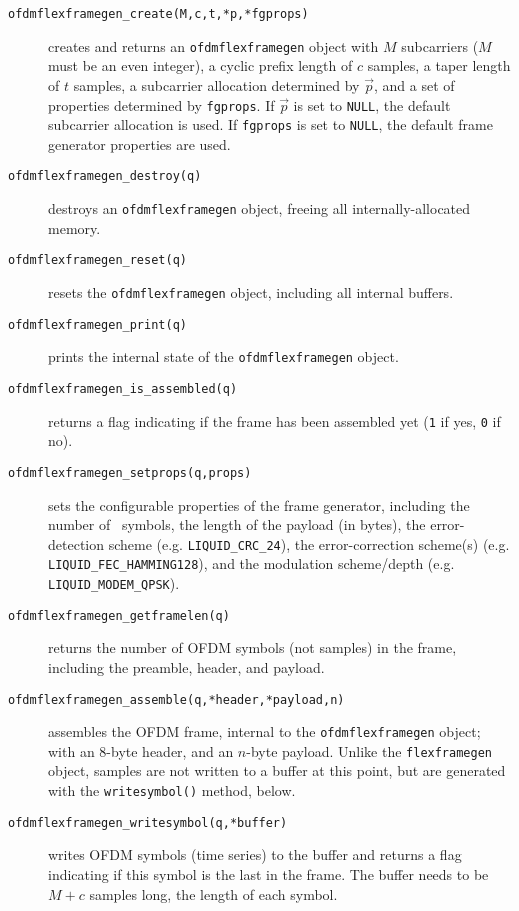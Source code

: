 \begin{description}
%
\item[{\tt ofdmflexframegen\_create(M,c,t,*p,*fgprops)}]
    creates and returns an {\tt ofdmflexframegen} object
    with $M$ subcarriers ($M$ must be an even integer),
    a cyclic prefix length of $c$ samples,
    a taper length of $t$ samples,
    a subcarrier allocation determined by $\vec{p}$,
    and a set of properties determined by {\tt fgprops}.
    If $\vec{p}$ is set to {\tt NULL}, the default subcarrier allocation
    is used.
    If {\tt fgprops} is set to {\tt NULL}, the default frame generator
    properties are used.
%
\item[{\tt ofdmflexframegen\_destroy(q)}]
    destroys an {\tt ofdmflexframegen} object, freeing all
    internally-allocated memory.
%
\item[{\tt ofdmflexframegen\_reset(q)}]
    resets the {\tt ofdmflexframegen} object, including all internal
    buffers.
%
\item[{\tt ofdmflexframegen\_print(q)}]
    prints the internal state of the {\tt ofdmflexframegen} object.
%
\item[{\tt ofdmflexframegen\_is\_assembled(q)}]
    returns a flag indicating if the frame has been assembled yet
    ({\tt 1} if yes, {\tt 0} if no).
%
\item[{\tt ofdmflexframegen\_setprops(q,props)}]
    sets the configurable properties of the frame generator, including
    the number of \Ss\ symbols,
    the length of the payload (in bytes),
    the error-detection scheme (e.g. {\tt LIQUID\_CRC\_24}),
    the error-correction scheme(s) (e.g. {\tt LIQUID\_FEC\_HAMMING128}),
    and the modulation scheme/depth (e.g. {\tt LIQUID\_MODEM\_QPSK}).
%
\item[{\tt ofdmflexframegen\_getframelen(q)}]
    returns the number of OFDM symbols (not samples) in the frame,
    including the preamble, header, and payload.
%
\item[{\tt ofdmflexframegen\_assemble(q,*header,*payload,n)}]
    assembles the OFDM frame, internal to the {\tt ofdmflexframegen}
    object; with an 8-byte header, and an $n$-byte payload.
    Unlike the {\tt flexframegen} object, samples are not written to a
    buffer at this point, but are generated with the
    {\tt writesymbol()} method, below.
%
\item[{\tt ofdmflexframegen\_writesymbol(q,*buffer)}]
    writes OFDM symbols (time series) to the buffer and returns a flag
    indicating if this symbol is the last in the frame.
    The buffer needs to be $M+c$ samples long, the length of each
    symbol.
%
\end{description}


